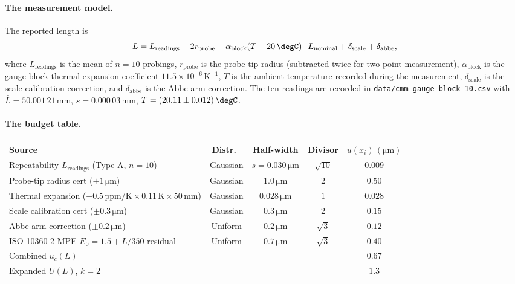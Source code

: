 \paragraph{The measurement model.} The reported length is
\[
L = L_{\text{readings}} - 2 r_{\text{probe}} -
\alpha_{\text{block}} (T - 20\,\degC) \cdot L_{\text{nominal}}
+ \delta_{\text{scale}} + \delta_{\text{abbe}},
\]
where $L_{\text{readings}}$ is the mean of $n = 10$ probings,
$r_{\text{probe}}$ is the probe-tip radius (subtracted twice
for two-point measurement), $\alpha_{\text{block}}$ is the
gauge-block thermal expansion coefficient $11.5 \times 10^{-6}\,
\si{\kelvin}^{-1}$, $T$ is the ambient temperature recorded
during the measurement, $\delta_{\text{scale}}$ is the
scale-calibration correction, and $\delta_{\text{abbe}}$ is the
Abbe-arm correction. The ten readings are recorded in
\texttt{data/cmm-gauge-block-10.csv} with $\bar{L} = 50.001\,21\,
\si{\milli\meter}$, $s = 0.000\,03\,\si{\milli\meter}$, $T =
(20.11 \pm 0.012)\,\degC$.

\paragraph{The budget table.}

\begin{center}
\small
\begin{tabular}{lcccc}
\toprule
Source & Distr.\ & Half-width & Divisor & $u(x_{i})\,(\si{
\micro\meter})$ \\
\midrule
Repeatability $L_{\text{readings}}$ (Type A, $n=10$) & Gaussian & $s = 0.030\,\si{\micro\meter}$ & $\sqrt{10}$ & $0.009$ \\
Probe-tip radius cert ($\pm 1\,\si{\micro\meter}$) & Gaussian & $1.0\,\si{\micro\meter}$ & $2$ & $0.50$ \\
Thermal expansion ($\pm 0.5\,\text{ppm}/\si{\kelvin} \times 0.11\,\si{\kelvin} \times 50\,\si{\milli\meter}$) & Gaussian & $0.028\,\si{\micro\meter}$ & $1$ & $0.028$ \\
Scale calibration cert ($\pm 0.3\,\si{\micro\meter}$) & Gaussian & $0.3\,\si{\micro\meter}$ & $2$ & $0.15$ \\
Abbe-arm correction ($\pm 0.2\,\si{\micro\meter}$) & Uniform & $0.2\,\si{\micro\meter}$ & $\sqrt{3}$ & $0.12$ \\
ISO 10360-2 MPE $E_{0} = 1.5 + L/350$ residual & Uniform & $0.7\,\si{\micro\meter}$ & $\sqrt{3}$ & $0.40$ \\
\midrule
Combined $u_{c}(L)$ & & & & $0.67$ \\
Expanded $U(L)$, $k = 2$ & & & & $1.3$ \\
\bottomrule
\end{tabular}
\end{center}

